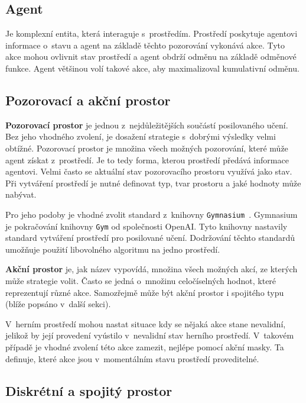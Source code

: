 \subsection{Agent}\label{subsec:agent}

Je komplexní entita, která interaguje s~prostředím.
Prostředí poskytuje agentovi informace o~stavu a agent na základě těchto pozorování vykonává akce.
Tyto akce mohou ovlivnit stav prostředí a agent obdrží odměnu na základě odměnové funkce.
Agent většinou volí takové akce, aby maximalizoval kumulativní odměnu.

\subsection{Pozorovací a akční prostor}
\label{subsec:prostory}

\textbf{Pozorovací prostor} je jednou z~nejdůležitějších součástí posilovaného učení.
Bez jeho vhodného zvolení, je dosažení strategie s~dobrými výsledky velmi obtížné.
Pozorovací prostor je množina všech možných pozorování, které může agent získat z~prostředí.
Je to tedy forma, kterou prostředí předává informace agentovi.
Velmi často se aktuální stav pozorovacího prostoru využívá jako stav.
Při vytváření prostředí je nutné definovat typ, tvar prostoru a jaké hodnoty může nabývat.

Pro jeho podoby je vhodné zvolit standard z~knihovny \texttt{Gymnasium}~\cite{Gymnasium}.
Gymnasium je pokračování knihovny \texttt{Gym} od společnosti OpenAI\@.
Tyto knihovny nastavily standard vytváření prostředí pro posilované učení.
Dodržování těchto standardů umožňuje použití libovolného algoritmu na jedno prostředí.

\bigskip

\textbf{Akční prostor} je, jak název vypovídá, množina všech možných akcí, ze kterých může strategie volit.
Často se jedná o~množinu celočíselných hodnot, které reprezentují různé akce.
Samozřejmě může být akční prostor i spojitého typu (blíže popsáno v~další sekci).

V~herním prostředí mohou nastat situace kdy se nějaká akce stane nevalidní, jelikož by její provedení vyústilo v~nevalidní stav herního prostředí.
V~takovém případě je vhodné zvolení této akce zamezit, nejlépe pomocí akční masky.
Ta definuje, které akce jsou v~momentálním stavu prostředí proveditelné.

\subsection{Diskrétní a spojitý prostor}\label{subsec:diskretni-a-spojity-prostor}

